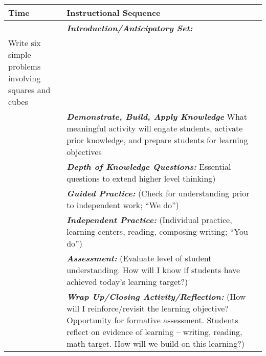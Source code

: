 \pagebreak

\begin{tabularx}{\textwidth}{|p{0.5in}|X|}
  \hline

  \centerline{\textbf{\large Time}} &  \textbf{\large Instructional Sequence } \\
  \hline
  
  \textbf{} &  \textbf{\em Introduction/Anticipatory Set:}  \\
  Write six simple problems involving squares and cubes \\
  \hline
  
  \textbf{} & \textbf{\em Demonstrate, Build, Apply Knowledge} {\tiny
    What meaningful activity will engate students, activate prior
    knowledge, and prepare students for learning objectives} \\
  \hline
  
  \textbf{} & \textbf{\em Depth of Knowledge Questions:} {\tiny
    Essential questions to extend higher level thinking)} \\
  \hline

  \textbf{} & \textbf{\em Guided Practice:} {\tiny (Check for
    understanding prior to independent work; “We do”)} \\
  \hline
  
  \textbf{} & \textbf{\em Independent Practice:} {\tiny (Individual
    practice, learning centers, reading, composing writing; “You do”)} \\
  \hline
  
  \textbf{} & \textbf{\em Assessment:} {\tiny (Evaluate level of
    student understanding. How will I know if students have achieved
    today’s learning target?)} \\
  \hline
  
  \textbf{} & \textbf{\em Wrap Up/Closing Activity/Reflection:} {\tiny
    (How will I reinforce/revisit the learning objective? Opportunity
    for formative assessment. Students reflect on evidence of learning
    – writing, reading, math target. How will we build on this
    learning?)} \\
  \hline
  
\end{tabularx}

\vskip 6pt

